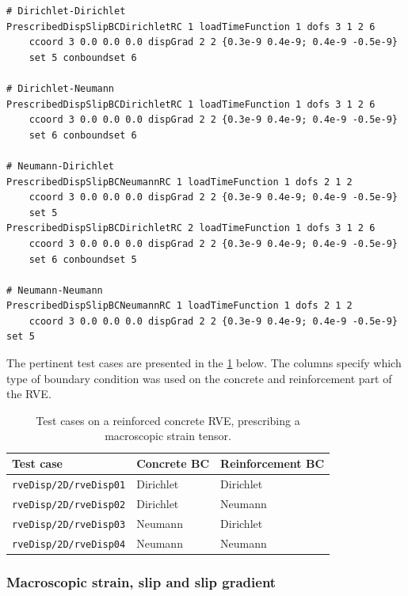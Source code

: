 \documentclass[11pt]{article}
\begin{document}
\begin{minipage}{\linewidth}
\begin{lstlisting}[style=oofem,language=oofeminput, caption={Use of boundary condition for prescribing a macroscopic strain tensor.}, label=lst:rveDisp]
# Dirichlet-Dirichlet
PrescribedDispSlipBCDirichletRC 1 loadTimeFunction 1 dofs 3 1 2 6 
    ccoord 3 0.0 0.0 0.0 dispGrad 2 2 {0.3e-9 0.4e-9; 0.4e-9 -0.5e-9} 
    set 5 conboundset 6

# Dirichlet-Neumann
PrescribedDispSlipBCDirichletRC 1 loadTimeFunction 1 dofs 3 1 2 6 
    ccoord 3 0.0 0.0 0.0 dispGrad 2 2 {0.3e-9 0.4e-9; 0.4e-9 -0.5e-9} 
    set 6 conboundset 6

# Neumann-Dirichlet
PrescribedDispSlipBCNeumannRC 1 loadTimeFunction 1 dofs 2 1 2 
    ccoord 3 0.0 0.0 0.0 dispGrad 2 2 {0.3e-9 0.4e-9; 0.4e-9 -0.5e-9} 
    set 5
PrescribedDispSlipBCDirichletRC 2 loadTimeFunction 1 dofs 3 1 2 6 
    ccoord 3 0.0 0.0 0.0 dispGrad 2 2 {0.3e-9 0.4e-9; 0.4e-9 -0.5e-9} 
    set 6 conboundset 5

# Neumann-Neumann
PrescribedDispSlipBCNeumannRC 1 loadTimeFunction 1 dofs 2 1 2 
    ccoord 3 0.0 0.0 0.0 dispGrad 2 2 {0.3e-9 0.4e-9; 0.4e-9 -0.5e-9} set 5

\end{lstlisting}
\end{minipage}
The pertinent test cases are presented in the \cref{tab:rveDisp} below. 
The columns specify which type of boundary condition was used on the concrete and reinforcement part of the RVE.

\begin{table}[H]
    \caption{Test cases on a reinforced concrete RVE, prescribing a macroscopic strain tensor.}
    \centering
\begin{tabular}{|l|l|l|}
\hline
 Test case   & Concrete BC  & Reinforcement BC \\ \hline
\texttt{rveDisp/2D/rveDisp01} & Dirichlet & Dirichlet     \\ \hline
\texttt{rveDisp/2D/rveDisp02} & Dirichlet & Neumann       \\ \hline
\texttt{rveDisp/2D/rveDisp03} & Neumann   & Dirichlet     \\ \hline
\texttt{rveDisp/2D/rveDisp04} & Neumann   & Neumann       \\ \hline
\end{tabular}
\label{tab:rveDisp}
\end{table}


\subsubsection{Macroscopic strain, slip and slip gradient}
\end{document}
